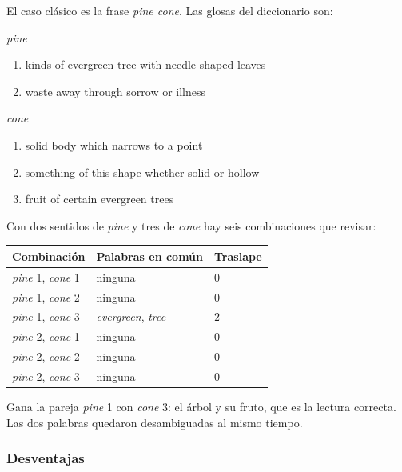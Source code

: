 \documentclass[11pt,letterpaper]{article}
\begin{document}
\begin{ejemplo}
    El caso clásico es la frase \textit{pine cone}. Las glosas del
    diccionario son:

    \textit{pine}
    \begin{enumerate}[itemsep=0.1em,label=\arabic*.]
        \item kinds of evergreen tree with needle-shaped leaves
        \item waste away through sorrow or illness
    \end{enumerate}

    \textit{cone}
    \begin{enumerate}[itemsep=0.1em,label=\arabic*.]
        \item solid body which narrows to a point
        \item something of this shape whether solid or hollow
        \item fruit of certain evergreen trees
    \end{enumerate}

    Con dos sentidos de \textit{pine} y tres de \textit{cone} hay
    seis combinaciones que revisar:

    \begin{center}
    \begin{tabular}{lll}
        \toprule
        \textbf{Combinación} & \textbf{Palabras en común} &
        \textbf{Traslape} \\
        \midrule
        \textit{pine} 1, \textit{cone} 1 & ninguna & $0$ \\
        \textit{pine} 1, \textit{cone} 2 & ninguna & $0$ \\
        \textit{pine} 1, \textit{cone} 3 &
        \textit{evergreen}, \textit{tree} & $2$ \\
        \textit{pine} 2, \textit{cone} 1 & ninguna & $0$ \\
        \textit{pine} 2, \textit{cone} 2 & ninguna & $0$ \\
        \textit{pine} 2, \textit{cone} 3 & ninguna & $0$ \\
        \bottomrule
    \end{tabular}
    \end{center}

    Gana la pareja \textit{pine} 1 con \textit{cone} 3: el árbol y su
    fruto, que es la lectura correcta. Las dos palabras quedaron
    desambiguadas al mismo tiempo.
\end{ejemplo}

\subsubsection*{Desventajas}
\end{document}
